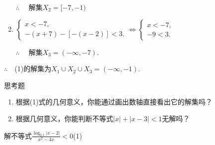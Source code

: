 \begin{solution}
\begin{enumerate}[(1)]
    $\therefore\quad$ 解集$X_2=[-7,-1)$
    
\item $\begin{cases} x< - 7, \\ - ( x+ 7) - [ - ( x- 2) ] < 3. 
\end{cases} 
\Longleftrightarrow \begin{cases} x< - 7, \\ - 9< 3. \end{cases}$

$\therefore\quad$ 解集$X_3=(-\infty,-7)$.
\end{enumerate}

$\therefore\quad$(1)的解集为$X_1\cup X_2\cup X_3=(-\infty,-1)$.
\end{solution}

\begin{thm}{思考题}
\begin{enumerate}[(1)]
    \item 根据(1)式的几何意义，你能通过画出数轴直接看出它的解集吗？
    \item 根据几何意义，你能判断不等式$|x|+|x-3|<1$无解吗？
\end{enumerate}
\end{thm}

\begin{example}
    解不等式$\frac{\log_{0.1}|x-2|}{x^2-4x}<0$\hfill (1)
\end{example}

